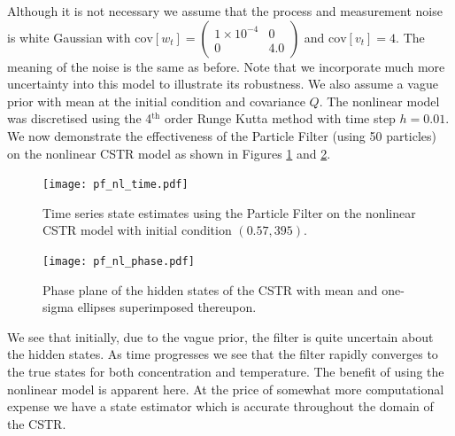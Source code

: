 \documentclass[../masters.tex]{subfiles}
\begin{document}
Although it is not necessary we assume that the process and measurement noise is white Gaussian with $\text{cov}[w_t] = \begin{pmatrix}
1\times 10^{-4} & 0 \\ 0 & 4.0 
\end{pmatrix}$ and $\text{cov}[v_t] = 4$. The meaning of the noise is the same as before. Note that we incorporate much more uncertainty into this model to illustrate its robustness. We also assume a vague prior with mean at the initial condition and covariance $Q$. The nonlinear model was discretised using the 4$^{\text{th}}$ order Runge Kutta method \cite{edwardsandpenny} with time step $h=0.01$. We now demonstrate the effectiveness of the Particle Filter (using 50 particles) on the nonlinear CSTR model as shown in Figures \ref{fig_pfnltime} and \ref{fig_pfnlphase}.
\begin{figure}[H] 
\centering
\texttt{[image: pf\_nl\_time.pdf]}
\caption{Time series state estimates using the Particle Filter on the nonlinear CSTR model with initial condition $(0.57, 395)$.}
\label{fig_pfnltime}
\end{figure}
\begin{figure}[H] 
\centering
\texttt{[image: pf\_nl\_phase.pdf]}
\caption{Phase plane of the hidden states of the CSTR with mean and one-sigma ellipses superimposed thereupon.}
\label{fig_pfnlphase}
\end{figure}
We see that initially, due to the vague prior, the filter is quite uncertain about the hidden states. As time progresses we see that the filter rapidly converges to the true states for both concentration and temperature. The benefit of using the nonlinear model is apparent here. At the price of somewhat more computational expense we have a state estimator which is accurate throughout the domain of the CSTR.
\end{document}

